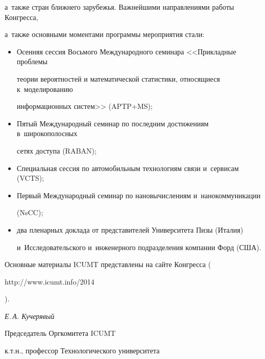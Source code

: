 а~также стран ближнего зарубежья. Важнейшими направлениями работы Конгресса,


а~также основными моментами программы мероприятия стали:


   \begin{itemize}


\item Осенняя сессия Восьмого Международного семинара <<Прикладные проблемы


теории вероятностей и математической статистики, относящиеся к~моделированию


информационных систем>> (APTP\;+\;MS);


\item Пятый Международный семинар по последним достижениям в~широкополосных


сетях доступа (RABAN);


\item Специальная сессия по автомобильным технологиям связи и~сервисам (VCTS);


\item Первый Международный семинар по нановычислениям и~нанокоммуникации


(NsCC);


\item два пленарных доклада от представителей Университета Пизы (Италия)


и~Исследовательского и~инженерного подразделения компании Форд (США).


\end{itemize}





   Основные материалы ICUMT представлены на сайте Конгресса ({\sf


http://www.icumt.info/2014}).





\vspace*{5mm}





\hfill \textit{Е.\,А. Кучерявый}








\hfill Председатель Оргкомитета ICUMT





\hfill к.т.н., профессор Технологического университета





